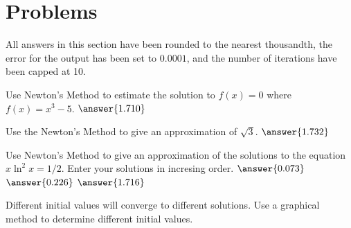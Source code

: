 \documentclass{ximera}
\begin{document}
\section{Problems}

All answers in this section have been rounded to the nearest thousandth, the error for the output has been set to $0.0001$, and the number of iterations have been capped at 10.

\begin{question}
	Use Newton's Method to estimate the solution to $f(x)=0$ where $f(x)=x^3-5$. $\answer{1.710}$
\end{question}

\begin{question}
	Use the Newton's Method to give an approximation of $\sqrt{3}$. $\answer{1.732}$
\end{question}

\begin{question}
	Use Newton's Method to give an approximation of the solutions to the equation $x\ln^2{x}=1/2$. Enter your solutions in incresing order. $\answer{0.073}$ $\answer{0.226}$ $\answer{1.716}$
	\begin{hint}
	Different initial values will converge to different solutions. Use a graphical method to determine different initial values.
	\end{hint}
\end{question}
\end{document}
